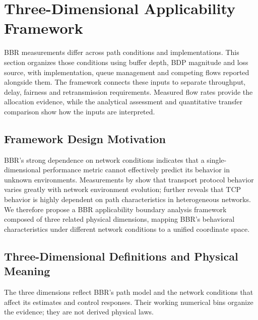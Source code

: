 \documentclass[a4paper,fleqn]{cas-sc}
\begin{document}
\FloatBarrier

\section{Three-Dimensional Applicability Framework}
\label{sec:framework}

BBR measurements differ across path conditions and implementations. This
section organizes those conditions using buffer depth, BDP magnitude and
loss source, with implementation, queue management and competing flows
reported alongside them. The framework connects these inputs to separate
throughput, delay, fairness and retransmission requirements. Measured flow
rates provide the allocation evidence, while the analytical assessment and
quantitative transfer comparison show how the inputs are interpreted.

\subsection{Framework Design Motivation}

BBR's strong dependence on network conditions indicates that a single-dimensional
performance metric cannot effectively predict its behavior in unknown environments.
Measurements by \citet{medina2004transport} show that transport protocol behavior
varies greatly with network environment evolution; \citet{barakat2000tcp} further
reveals that TCP behavior is highly dependent on path characteristics in
heterogeneous networks. We therefore propose a BBR applicability boundary
analysis framework composed of three related physical dimensions, mapping BBR's
behavioral characteristics under different network conditions to a unified
coordinate space.

\subsection{Three-Dimensional Definitions and Physical Meaning}
\label{sec:framework_dim}

The three dimensions reflect BBR's path model and the network conditions
that affect its estimates and control responses. Their working numerical
bins organize the evidence; they are not derived physical laws.
\end{document}

